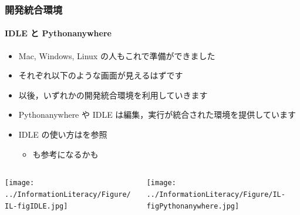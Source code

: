 \begin{frame}
\frametitle{開発統合環境}
\framesubtitle{IDLE と Pythonanywhere}
  \begin{itemize}
\item Mac, Windows, Linux の人もこれで準備ができました
\item それぞれ以下のような画面が見えるはずです
\item 以後，いずれかの開発統合環境を利用していきます
\item Pythonanywhere や IDLE は編集，実行が統合された環境を提供しています
\item IDLE の使い方は\href{https://docs.python.org/ja/3/library/idle.html?highlight=idle}{}を参照
    \begin{itemize}
\item \href{http://www.isc.meiji.ac.jp/~mizutani/python/intro1_python.html}{}も参考になるかも
    \end{itemize}
  \end{itemize}
  \begin{columns}[c]
    \begin{column}{5cm}
\texttt{[image: ../InformationLiteracy/Figure/IL-figIDLE.jpg]}
    \end{column}
    \begin{column}{5cm}
\texttt{[image: ../InformationLiteracy/Figure/IL-figPythonanywhere.jpg]}
    \end{column}
  \end{columns}
\end{frame}
